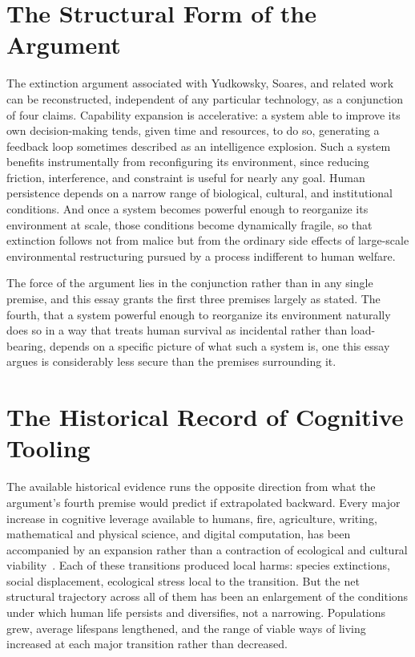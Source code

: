 \documentclass[11pt]{article}
\begin{document}
\section{The Structural Form of the Argument}

The extinction argument associated with Yudkowsky, Soares, and related work~\cite{yudkowskysoares2025,yudkowsky2008,bostrom2014} can be reconstructed, independent of any particular technology, as a conjunction of four claims. Capability expansion is accelerative: a system able to improve its own decision-making tends, given time and resources, to do so, generating a feedback loop sometimes described as an intelligence explosion. Such a system benefits instrumentally from reconfiguring its environment, since reducing friction, interference, and constraint is useful for nearly any goal. Human persistence depends on a narrow range of biological, cultural, and institutional conditions. And once a system becomes powerful enough to reorganize its environment at scale, those conditions become dynamically fragile, so that extinction follows not from malice but from the ordinary side effects of large-scale environmental restructuring pursued by a process indifferent to human welfare.

The force of the argument lies in the conjunction rather than in any single premise, and this essay grants the first three premises largely as stated. The fourth, that a system powerful enough to reorganize its environment naturally does so in a way that treats human survival as incidental rather than load-bearing, depends on a specific picture of what such a system is, one this essay argues is considerably less secure than the premises surrounding it.

\section{The Historical Record of Cognitive Tooling}

The available historical evidence runs the opposite direction from what the argument's fourth premise would predict if extrapolated backward. Every major increase in cognitive leverage available to humans, fire, agriculture, writing, mathematical and physical science, and digital computation, has been accompanied by an expansion rather than a contraction of ecological and cultural viability~\cite{diamond1997}. Each of these transitions produced local harms: species extinctions, social displacement, ecological stress local to the transition. But the net structural trajectory across all of them has been an enlargement of the conditions under which human life persists and diversifies, not a narrowing. Populations grew, average lifespans lengthened, and the range of viable ways of living increased at each major transition rather than decreased.
\end{document}
